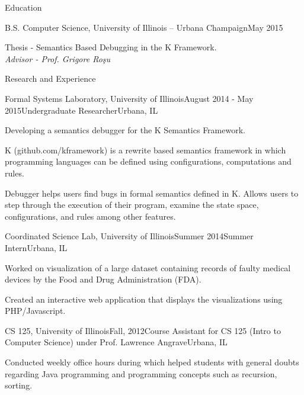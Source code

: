 \documentclass{resume} %
\begin{document}

\begin{rSection}{Education}
\begin{rSubsection}{ B.S. Computer Science, University of Illinois -- Urbana Champaign}{May 2015}{}{}
\item Thesis - Semantics Based Debugging in the K Framework. \\
	\em{Advisor} - Prof. Grigore Ro{\c s}u
\end{rSubsection}
\end{rSection}



\begin{rSection}{Research and Experience}

\begin{rSubsection}{Formal Systems Laboratory, University of Illinois}{August 2014 - May 2015}{Undergraduate Researcher}{Urbana, IL}
\item Developing a semantics debugger for the K Semantics Framework.
\item K (github.com/kframework) is a rewrite based semantics framework in which programming
languages can be defined using configurations, computations and rules.
\item Debugger helps users find bugs in formal semantics defined in K. Allows users to step
through the execution of their program, examine the state space, configurations, and rules
among other features.
\end{rSubsection}


\begin{rSubsection}{Coordinated Science Lab, University of Illinois}{Summer 2014}{Summer Intern}{Urbana, IL}
\item Worked on visualization of a large dataset containing records of faulty medical devices by the Food and Drug Administration (FDA).
\item Created an interactive web application that displays the visualizations using PHP/Javascript.
\end{rSubsection}


\begin{rSubsection}{CS 125, University of Illinois}{Fall, 2012}{Course Assistant for CS 125 (Intro to Computer Science) under Prof. Lawrence Angrave}{Urbana, IL}
\item Conducted weekly office hours during which helped students with general doubts regarding
Java programming and programming concepts such as recursion, sorting.
\end{rSubsection}

\end{rSection}
\end{document}
